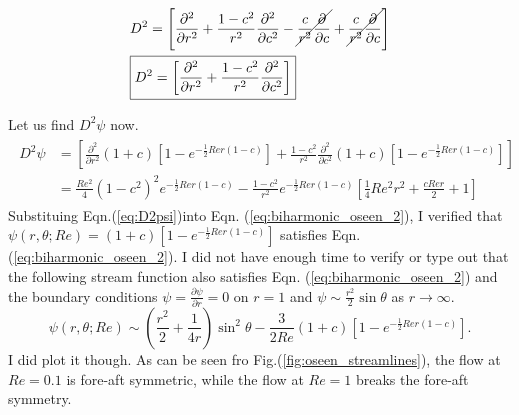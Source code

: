\documentclass{article}
\begin{document}
\begin{align}\label{eq:Dsq_2}
 \begin{split}
  & D^{2} = \left[\frac{\partial^{2} }{\partial r^{2}} + \frac{1-c^{2}}{r^{2}} \frac{\partial^{2} }{\partial c^{2}} - \cancel{\frac{c}{r^{2}}\frac{\partial}{\partial c} }+ \cancel{\frac{c}{r^{2}}\frac{\partial}{\partial c} }\right]\\
 &\boxed{D^{2} = \left[ \frac{\partial^{2} }{\partial r^{2}} + \frac{1-c^{2}}{r^{2}} \frac{\partial^{2} }{\partial c^{2}}\right] }
 \end{split}
\end{align}

Let us find $D^{2}\psi$ now.
\begin{align}\label{eq:D2psi}
 \begin{split}
  D^{2}\psi &= \left[ \frac{\partial^{2}}{\partial r^{2}}(1+c)[1 - e^{-\frac{1}{2} Re r(1-c)}]  + \frac{1-c^{2}}{r^{2}} \frac{\partial^{2} }{\partial c^{2}}(1+c)[1 - e^{-\frac{1}{2} Re r(1-c)}] \right] \\
  &= \frac{Re^{2}}{4}  (1-c^{2})^{2}e^{-\frac{1}{2} Re r(1-c)} -  \frac{1-c^{2}}{r^{2}}e^{-\frac{1}{2} Re r(1-c)}\left[\frac{1}{4}Re^{2}r^{2} + \frac{cRe r}{2} + 1 \right]
 \end{split}
\end{align}
Substituing Eqn.(\ref{eq:D2psi})into Eqn. (\ref{eq:biharmonic_oseen_2}), I verified that $\psi(r, \theta; Re) = (1+c)[1 - e^{-\frac{1}{2} Re r(1-c)}]$ satisfies Eqn. (\ref{eq:biharmonic_oseen_2}). 
I did not have enough time to verify or type out that the following stream function also satisfies Eqn. (\ref{eq:biharmonic_oseen_2}) and the boundary conditions $\psi = \frac{\partial \psi}{\partial r} = 0 $ on $r = 1$ and $\psi \sim \frac{r^{2}}{2}\sin{\theta}$ as $r\rightarrow \infty$.
\begin{equation}\label{eq:oseen_psi}
 \psi(r, \theta;Re) \sim \left(\frac{r^{2}}{2} + \frac{1}{4r}\right)\sin^{2}{\theta} - \frac{3}{2Re}(1+c)[1 - e^{-\frac{1}{2} Re r(1-c)}]. 
\end{equation}
I did plot it though. As can be seen fro Fig.(\ref{fig:oseen_streamlines}), the flow at $Re=0.1$ is fore-aft symmetric, while the flow at $Re=1$ breaks the fore-aft symmetry.
\end{document}
